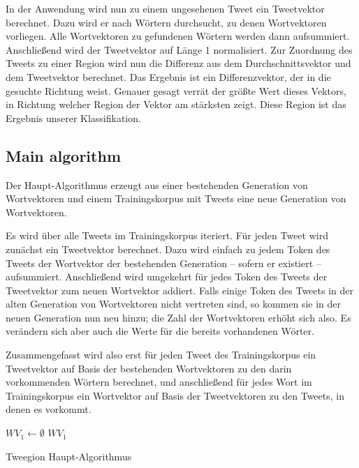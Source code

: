 \documentclass[../Main.tex]{subfiles}
\begin{document}
In der Anwendung wird nun zu einem ungesehenen Tweet ein Tweetvektor berechnet. Dazu wird er nach Wörtern durchsucht, zu denen Wortvektoren vorliegen. Alle Wortvektoren zu gefundenen Wörtern werden dann aufsummiert.
Anschließend wird der Tweetvektor auf Länge 1 normalisiert. Zur Zuordnung des Tweets zu einer Region wird nun die Differenz aus dem Durchschnittsvektor und dem Tweetvektor berechnet. Das Ergebnis ist ein Differenzvektor, der in die gesuchte Richtung weist. Genauer gesagt verrät der größte Wert dieses Vektors, in Richtung welcher Region der Vektor am stärksten zeigt. Diese Region ist das Ergebnis unserer Klassifikation.

\subsection{Main algorithm}
Der Haupt-Algorithmus erzeugt aus einer bestehenden Generation von Wortvektoren und einem Trainingskorpus mit Tweets eine neue Generation von Wortvektoren.

Es wird über alle Tweets im Trainingskorpus iteriert. Für jeden Tweet wird zunächst ein Tweetvektor berechnet. Dazu wird einfach zu jedem Token des Tweets der Wortvektor der bestehenden Generation -- sofern er existiert -- aufsummiert. Anschließend wird umgekehrt für jedes Token des Tweets der Tweetvektor zum neuen Wortvektor addiert. Falls einige Token des Tweets in der alten Generation von Wortvektoren nicht vertreten sind, so kommen sie in der neuen Generation nun neu hinzu; die Zahl der Wortvektoren erhöht sich also. Es verändern sich aber auch die Werte für die bereits vorhandenen Wörter.

Zusammengefasst wird also erst für jeden Tweet des Trainingskorpus ein Tweetvektor auf Basis der bestehenden Wortvektoren zu den darin vorkommenden Wörtern berechnet, und anschließend für jedes Wort im Trainingskorpus ein Wortvektor auf Basis der Tweetvektoren zu den Tweets, in denen es vorkommt.\\

\begin{algorithm}[H]
 \SetAlgoLined\DontPrintSemicolon
 $WV_1 \gets\emptyset $\;
 \Return $WV_1$\;
 \caption{Tweegion Haupt-Algorithmus}
\end{algorithm}
\end{document}
